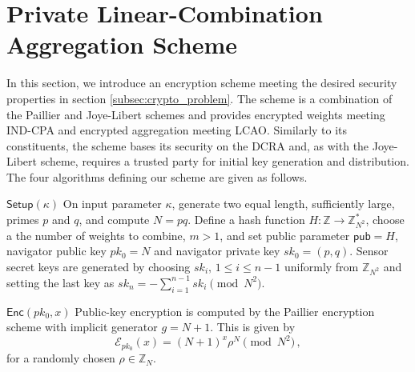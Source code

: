 \documentclass[10pt,letterpaper,oneside,twocolumn,journal]{IEEEtran}
\theoremstyle{definition}
\theoremstyle{definition}
\theoremstyle{remark}
\begin{document}
\section{Private Linear-Combination Aggregation Scheme} \label{sec:lcao_scheme}
In this section, we introduce an encryption scheme meeting the desired security properties in section \ref{subsec:crypto_problem}. The scheme is a combination of the Paillier and Joye-Libert schemes and provides encrypted weights meeting IND-CPA and encrypted aggregation meeting LCAO. Similarly to its constituents, the scheme bases its security on the DCRA and, as with the Joye-Libert scheme, requires a trusted party for initial key generation and distribution. The four algorithms defining our scheme are given as follows.
\begin{LaTeXdescription}
    \item[$\mathsf{Setup}(\kappa)$] On input parameter $\kappa$, generate two equal length, sufficiently large, primes $p$ and $q$, and compute $N=pq$. Define a hash function $H:\mathbb{Z} \rightarrow \mathbb{Z}_{N^2}^*$, choose a the number of weights to combine, $m>1$, and set public parameter $\mathsf{pub}=H$, navigator public key $pk_0 = N$ and navigator private key $sk_0=(p,q)$. Sensor secret keys are generated by choosing $sk_i,\,1\leq i\leq n-1$ uniformly from $\mathbb{Z}_{N^2}$ and setting the last key as $sk_n = -\sum^{n-1}_{i=1}sk_i \pmod{N^2}$.
 
    \item[$\mathsf{Enc}(pk_0, x)$] Public-key encryption is computed by the Paillier encryption scheme with implicit generator $g=N+1$. This is given by
    \begin{equation}
        \mathcal{E}_{pk_0}(x) = (N+1)^{x}\rho^N \pmod{N^2}\,, \label{eqn:our_scheme_encrypt}
    \end{equation}
    for a randomly chosen $\rho \in \mathbb{Z}_N$.


\end{LaTeXdescription}
\end{document}
